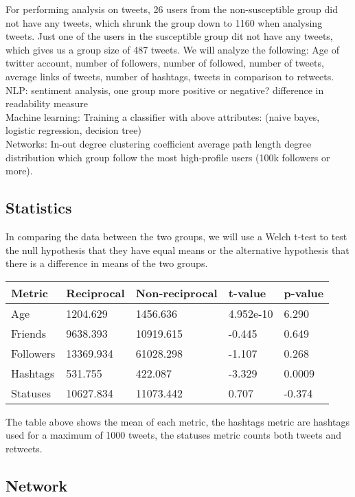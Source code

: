 \documentclass[10pt]{IEEEtran}
\begin{document}
For performing analysis on tweets, 26 users from the non-susceptible group did not have any tweets, which shrunk the group down to 1160 when analysing tweets. Just one of the users in the susceptible group dit not have any tweets, which gives us a group size of 487 tweets.
We will analyze the following: Age of twitter account, number of followers, number of followed, number of tweets, average links of tweets, number of hashtags, tweets in comparison to retweets.
\\
NLP:
sentiment analysis, one group more positive or negative?
difference in readability measure
\\
Machine learning:
Training a classifier with above attributes: (naive bayes, logistic regression, decision tree)
\\
Networks:
In-out degree
clustering coefficient
average path length
degree distribution
which group follow the most high-profile users (100k followers or more).

\subsection{Statistics}
In comparing the data between the two groups, we will use a Welch t-test to test the null hypothesis that they have equal means or the alternative hypothesis that there is a difference in means of the two groups.

\begin{table}[h]
\begin{tabular}{lllll}
\hline
Metric & Reciprocal & Non-reciprocal & t-value & p-value \\ \hline
Age & 1204.629 & 1456.636 & 4.952e-10 & 6.290 \\
Friends & 9638.393 & 10919.615 & -0.445 & 0.649 \\
Followers & 13369.934 & 61028.298 & -1.107 & 0.268 \\
Hashtags & 531.755 & 422.087 & -3.329 & 0.0009 \\
Statuses & 10627.834 & 11073.442 & 0.707 & -0.374 \\ \hline
\end{tabular}
\end{table}

The table above shows the mean of each metric, the hashtags metric are hashtags used for a maximum of 1000 tweets, the statuses metric counts both tweets and retweets.

\subsection{Network}
\end{document}

